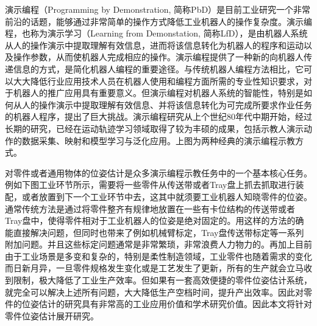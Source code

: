 演示编程（Programming by Demonstration, 简称PbD）是目前工业研究一个非常前沿的话题，能够通过非常简单的操作方式降低工业机器人的操作复杂度。演示编程，也称为演示学习（Learning from Demonstation, 简称LfD），是由机器人系统从人的操作演示中提取理解有效信息，进而将该信息转化为机器人的程序和运动以及操作参数，从而使机器人完成相应的操作\cite{billard2008robot}。演示编程提供了一种新的向机器人传递信息的方式，是简化机器人编程的重要途径\cite{argall2009survey}。与传统机器人编程方法相比，它可以大大降低行业应用技术人员在机器人使用和编程方面所需的专业性知识要求，对于机器人的推广应用具有重要意义。但演示编程对机器人系统的智能性，特别是如何从人的操作演示中提取理解有效信息、并将该信息转化为可完成所要求作业任务的机器人程序，提出了巨大挑战。演示编程研究从上个世纪80年代中期开始，经过长期的研究，已经在运动轨迹学习领域取得了较为丰硕的成果，包括示教人演示动作的数据采集、映射和模型学习与泛化应用。上图为两种经典的演示编程示教方式。

对零件或者通用物体的位姿估计是众多演示编程示教任务中的一个基本核心任务。例如下图工业环节所示，需要将一些零件从传送带或者Tray盘上抓去抓取进行装配，或者放置到下一个工业环节中去，这其中就须要工业机器人知晓零件的位姿。通常传统方法是通过将零件整齐有规律地放置在一些有卡位结构的传送带或者Tray盘中，使得零件相对于工业机器人的位姿是绝对固定的。用这样的方法的确能直接解决问题，但同时也带来了例如机械臂标定，Tray盘传送带标定等一系列附加问题。并且这些标定问题通常是非常繁琐，非常浪费人力物力的。再加上目前由于工业场景是多变和复杂的，特别是柔性制造领域，工业零件也随着需求的变化而日新月异，一旦零件规格发生变化或是工艺发生了更新，所有的生产就会立马收到限制，极大降低了工业生产效率。但如果有一套高效便捷的零件位姿估计系统，就完全可以解决上述所有问题，大大降低生产空档时间，提升产出效率。因此对零件的位姿估计的研究具有非常高的工业应用价值和学术研究价值。因此本文将针对零件位姿估计展开研究。

